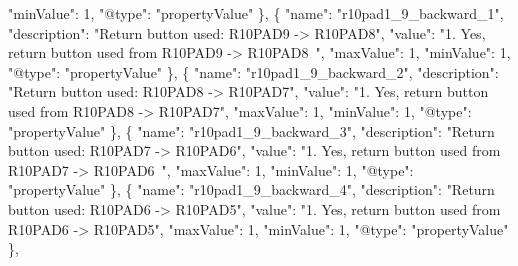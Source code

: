 \documentclass[
]{book}
\newenvironment{Shaded}{\begin{snugshade}}{\end{snugshade}}
\newcommand{\DataTypeTok}[1]{\textcolor[rgb]{0.13,0.29,0.53}{#1}}
\newcommand{\DecValTok}[1]{\textcolor[rgb]{0.00,0.00,0.81}{#1}}
\newcommand{\FunctionTok}[1]{\textcolor[rgb]{0.00,0.00,0.00}{#1}}
\newcommand{\OtherTok}[1]{\textcolor[rgb]{0.56,0.35,0.01}{#1}}
\newcommand{\StringTok}[1]{\textcolor[rgb]{0.31,0.60,0.02}{#1}}
\begin{document}
\begin{Shaded}
\begin{Highlighting}[]
      \DataTypeTok{"minValue"}\FunctionTok{:} \DecValTok{1}\FunctionTok{,}
      \DataTypeTok{"@type"}\FunctionTok{:} \StringTok{"propertyValue"}
    \FunctionTok{\}}\OtherTok{,}
    \FunctionTok{\{}
      \DataTypeTok{"name"}\FunctionTok{:} \StringTok{"r10pad1_9_backward_1"}\FunctionTok{,}
      \DataTypeTok{"description"}\FunctionTok{:} \StringTok{"Return button used: R10PAD9 -> R10PAD8"}\FunctionTok{,}
      \DataTypeTok{"value"}\FunctionTok{:} \StringTok{"1. Yes, return button used from R10PAD9 -> R10PAD8 "}\FunctionTok{,}
      \DataTypeTok{"maxValue"}\FunctionTok{:} \DecValTok{1}\FunctionTok{,}
      \DataTypeTok{"minValue"}\FunctionTok{:} \DecValTok{1}\FunctionTok{,}
      \DataTypeTok{"@type"}\FunctionTok{:} \StringTok{"propertyValue"}
    \FunctionTok{\}}\OtherTok{,}
    \FunctionTok{\{}
      \DataTypeTok{"name"}\FunctionTok{:} \StringTok{"r10pad1_9_backward_2"}\FunctionTok{,}
      \DataTypeTok{"description"}\FunctionTok{:} \StringTok{"Return button used: R10PAD8 -> R10PAD7"}\FunctionTok{,}
      \DataTypeTok{"value"}\FunctionTok{:} \StringTok{"1. Yes, return button used from R10PAD8 -> R10PAD7"}\FunctionTok{,}
      \DataTypeTok{"maxValue"}\FunctionTok{:} \DecValTok{1}\FunctionTok{,}
      \DataTypeTok{"minValue"}\FunctionTok{:} \DecValTok{1}\FunctionTok{,}
      \DataTypeTok{"@type"}\FunctionTok{:} \StringTok{"propertyValue"}
    \FunctionTok{\}}\OtherTok{,}
    \FunctionTok{\{}
      \DataTypeTok{"name"}\FunctionTok{:} \StringTok{"r10pad1_9_backward_3"}\FunctionTok{,}
      \DataTypeTok{"description"}\FunctionTok{:} \StringTok{"Return button used: R10PAD7 -> R10PAD6"}\FunctionTok{,}
      \DataTypeTok{"value"}\FunctionTok{:} \StringTok{"1. Yes, return button used from R10PAD7 -> R10PAD6 "}\FunctionTok{,}
      \DataTypeTok{"maxValue"}\FunctionTok{:} \DecValTok{1}\FunctionTok{,}
      \DataTypeTok{"minValue"}\FunctionTok{:} \DecValTok{1}\FunctionTok{,}
      \DataTypeTok{"@type"}\FunctionTok{:} \StringTok{"propertyValue"}
    \FunctionTok{\}}\OtherTok{,}
    \FunctionTok{\{}
      \DataTypeTok{"name"}\FunctionTok{:} \StringTok{"r10pad1_9_backward_4"}\FunctionTok{,}
      \DataTypeTok{"description"}\FunctionTok{:} \StringTok{"Return button used: R10PAD6 -> R10PAD5"}\FunctionTok{,}
      \DataTypeTok{"value"}\FunctionTok{:} \StringTok{"1. Yes, return button used from R10PAD6 -> R10PAD5"}\FunctionTok{,}
      \DataTypeTok{"maxValue"}\FunctionTok{:} \DecValTok{1}\FunctionTok{,}
      \DataTypeTok{"minValue"}\FunctionTok{:} \DecValTok{1}\FunctionTok{,}
      \DataTypeTok{"@type"}\FunctionTok{:} \StringTok{"propertyValue"}
    \FunctionTok{\}}\OtherTok{,}

\end{Highlighting}
\end{Shaded}
\end{document}
